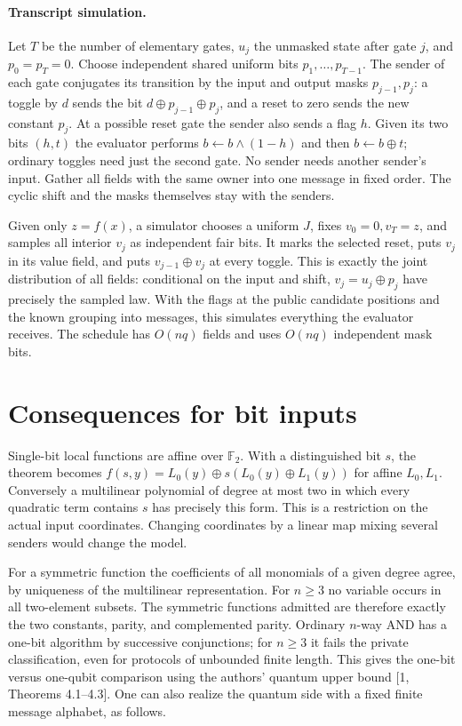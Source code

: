 \documentclass[11pt]{article}
\begin{document}
\paragraph{Transcript simulation.}
Let $T$ be the number of elementary gates, $u_j$ the unmasked state after gate $j$, and $p_0=p_T=0$. Choose independent shared uniform bits $p_1,\ldots,p_{T-1}$. The sender of each gate conjugates its transition by the input and output masks $p_{j-1},p_j$: a toggle by $d$ sends the bit $d\oplus p_{j-1}\oplus p_j$, and a reset to zero sends the new constant $p_j$. At a possible reset gate the sender also sends a flag $h$. Given its two bits $(h,t)$ the evaluator performs $b\gets b\wedge(1-h)$ and then $b\gets b\oplus t$; ordinary toggles need just the second gate. No sender needs another sender's input. Gather all fields with the same owner into one message in fixed order. The cyclic shift and the masks themselves stay with the senders.

Given only $z=f(x)$, a simulator chooses a uniform $J$, fixes $v_0=0,v_T=z$, and samples all interior $v_j$ as independent fair bits. It marks the selected reset, puts $v_j$ in its value field, and puts $v_{j-1}\oplus v_j$ at every toggle. This is exactly the joint distribution of all fields: conditional on the input and shift, $v_j=u_j\oplus p_j$ have precisely the sampled law. With the flags at the public candidate positions and the known grouping into messages, this simulates everything the evaluator receives. The schedule has $O(nq)$ fields and uses $O(nq)$ independent mask bits.
\section{Consequences for bit inputs}
Single-bit local functions are affine over $\mathbb F_2$. With a distinguished bit $s$, the theorem becomes $f(s,y)=L_0(y)\oplus s(L_0(y)\oplus L_1(y))$ for affine $L_0,L_1$. Conversely a multilinear polynomial of degree at most two in which every quadratic term contains $s$ has precisely this form. This is a restriction on the actual input coordinates. Changing coordinates by a linear map mixing several senders would change the model.

For a symmetric function the coefficients of all monomials of a given degree agree, by uniqueness of the multilinear representation. For $n\ge3$ no variable occurs in all two-element subsets. The symmetric functions admitted are therefore exactly the two constants, parity, and complemented parity. Ordinary $n$-way AND has a one-bit algorithm by successive conjunctions; for $n\ge3$ it fails the private classification, even for protocols of unbounded finite length. This gives the one-bit versus one-qubit comparison using the authors' quantum upper bound [1, Theorems 4.1--4.3]. One can also realize the quantum side with a fixed finite message alphabet, as follows.
\end{document}
